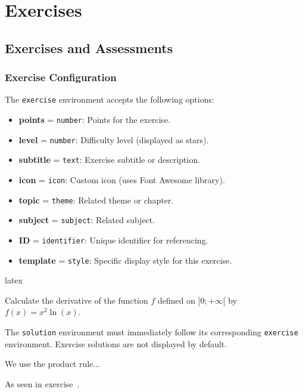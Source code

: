 \documentclass[
    margin=2cm
]{neoschool}
\begin{document}
\section{Exercises}

\subsection{Exercises and
Assessments}

\subsubsection{Exercise Configuration}

The \texttt{exercise} environment accepts the following
options:

\begin{itemize}
\item
  \textbf{points} = \texttt{number}: Points for the
  exercise.
\item
  \textbf{level} = \texttt{number}: Difficulty level
  (displayed as stars).
\item
  \textbf{subtitle} = \texttt{text}: Exercise subtitle
  or description.
\item
  \textbf{icon} = \texttt{icon}: Custom icon (uses Font
  Awesome library).
\item
  \textbf{topic} = \texttt{theme}: Related theme or
  chapter.
\item
  \textbf{subject} = \texttt{subject}: Related subject.
\item
  \textbf{ID} = \texttt{identifier}: Unique identifier
  for referencing.
\item
  \textbf{template} = \texttt{style}: Specific display
  style for this exercise.
\end{itemize}

\begin{code}{latex}
\begin{exercise}[
    points=4,
    level=2,
    subtitle=Derivatives,
    icon=\faPencil,
    topic=Analysis,
    subject=Mathematics,
    ID=der01,
    template=elegant-box
]
    Calculate the derivative of the function $f$ defined on $]0 ; +\infty[$
    by $f(x)=x^2\ln(x)$.
\end{exercise}

The \texttt{solution} environment must immediately follow its corresponding \texttt{exercise} environment. Exercise solutions are not displayed by default.

\begin{solution}
    We use the product rule...
\end{solution}

As seen in exercise~.
\end{code}
\end{document}
